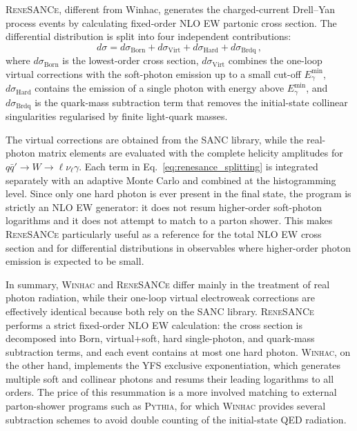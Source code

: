 \textsc{ReneSANCe}, different from Winhac, generates the charged-current Drell--Yan process events by calculating fixed-order NLO EW partonic cross section. The differential distribution is split into four independent contributions:
\begin{equation}
    d\sigma = d\sigma_{\mathrm{Born}}
    + d\sigma_{\mathrm{Virt}}
    + d\sigma_{\mathrm{Hard}}
    + d\sigma_{\mathrm{Brdq}}\,,
    \label{eq:renesance_splitting}
\end{equation}
where $d\sigma_{\mathrm{Born}}$ is the lowest-order cross section, $d\sigma_{\mathrm{Virt}}$ combines the one-loop virtual corrections with the soft-photon emission up to a small cut-off $E_\gamma^{\min}$, $d\sigma_{\mathrm{Hard}}$ contains the emission of a single photon with energy above $E_\gamma^{\min}$, and $d\sigma_{\mathrm{Brdq}}$ is the quark-mass subtraction term that removes the initial-state collinear singularities regularised by finite light-quark masses.

The virtual corrections are obtained from the \textsc{SANC} library, while the real-photon matrix elements are evaluated with the complete helicity amplitudes for $q\bar{q}'\to W\to \ell\nu_\ell\gamma$. Each term in Eq.~\eqref{eq:renesance_splitting} is integrated separately with an adaptive Monte Carlo and combined at the histogramming level. Since only one hard photon is ever present in the final state, the program is strictly an NLO EW generator: it does not resum higher-order soft-photon logarithms and it does not attempt to match to a parton shower. This makes \textsc{ReneSANCe} particularly useful as a reference for the total NLO EW cross section and for differential distributions in observables where higher-order photon emission is expected to be small.

In summary, \textsc{Winhac} and \textsc{ReneSANCe} differ mainly in the treatment of real photon radiation, while their one-loop virtual electroweak corrections are effectively identical because both rely on the \textsc{SANC} library. \textsc{ReneSANCe} performs a strict fixed-order NLO EW calculation: the cross section is decomposed into Born, virtual+soft, hard single-photon, and quark-mass subtraction terms, and each event contains at most one hard photon. \textsc{Winhac}, on the other hand, implements the YFS exclusive exponentiation, which generates multiple soft and collinear photons and resums their leading logarithms to all orders. The price of this resummation is a more involved matching to external parton-shower programs such as \textsc{Pythia}, for which \textsc{Winhac} provides several subtraction schemes to avoid double counting of the initial-state QED radiation.

